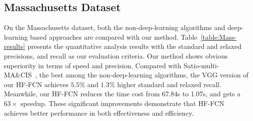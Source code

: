 \subsection{Massachusetts Dataset}
On the Massachusetts dataset, both the non-deep-learning algorithms and deep-learning based approaches are compared with our method. 
Table~\ref{table:Mass-results} presents the quantitative analysis results with the standard and relaxed precisions, and recall as our evaluation criteria.
Our method shows obvious superiority in terms of speed and precision. 
%
Compared with Satio-multi-MA\&CIS~\cite{IEEEexample:saito2016multiple}, the best among the non-deep-learning algorithms, the VGG version of our HF-FCN achieves $5.5\%$ and $1.3\%$ higher standard and relaxed recall.
%
Meanwhile, our HF-FCN reduces the time cost from 67.84s to 1.07s, and gets a $63\times$ speedup.
These significant improvements demonstrate that HF-FCN achieves better performance in both effectiveness and efficiency.

